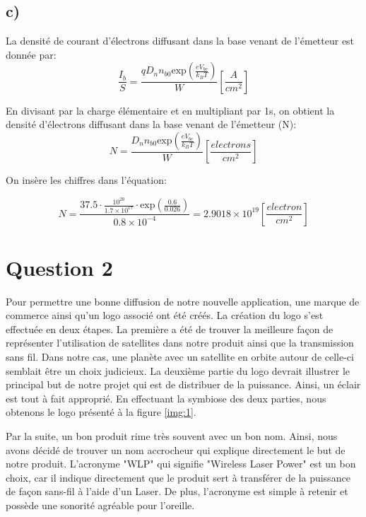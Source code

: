 \section*{c)}
La densité de courant d'électrons diffusant dans la base venant de l'émetteur est donnée par:
\begin{equation}
\frac{I_b}{S} = \frac{q D_n n_{b0} \mbox{exp}\left(\frac{e V_{be}}{k_B T}\right)}{W}\left[\frac{A}{cm^2}\right]
\end{equation}

En divisant par la charge élémentaire et en multipliant par 1s, on obtient la densité d'électrons diffusant dans la base venant de l'émetteur (N):
\begin{equation}
N = \frac{D_n n_{b0} \mbox{exp}\left(\frac{e V_{be}}{k_B T}\right)}{W} \left[\frac{electrons}{cm^2}\right]
\end{equation}

On insère les chiffres dans l'équation:

\begin{equation}
N = \frac{37.5 \cdot \frac{10^{20}}{1.7\times10^{17}}\cdot \mbox{exp}\left(\frac{0.6}{0.026}\right)}{0.8\times10^{-4}} = 2.9018 \times 10^{19} \left[\frac{electron}{cm^2}\right]
\end{equation}

\chapter*{Question 2}
Pour permettre une bonne diffusion de notre nouvelle application, une marque de commerce ainsi qu'un logo associé ont été créés. La création du logo s'est effectuée en deux étapes. La première a été de trouver la meilleure façon de représenter l'utilisation de satellites dans notre produit ainsi que la transmission sans fil. Dans notre cas, une planète avec un satellite en orbite autour de celle-ci semblait être un choix judicieux. La deuxième partie du logo devrait illustrer le principal but de notre projet qui est de distribuer de la puissance. Ainsi, un éclair est tout à fait approprié. En effectuant la symbiose des deux parties, nous obtenons le logo présenté à la figure \ref{img:1}.

Par la suite, un bon produit rime très souvent avec un bon nom. Ainsi, nous avons décidé de trouver un nom accrocheur qui explique directement le but de notre produit. L'acronyme "WLP" qui signifie "Wireless Laser Power" est un bon choix, car il indique directement que le produit sert à transférer de la puissance de façon sans-fil à l'aide d'un Laser. De plus, l'acronyme est simple à retenir et possède une sonorité agréable pour l'oreille.

